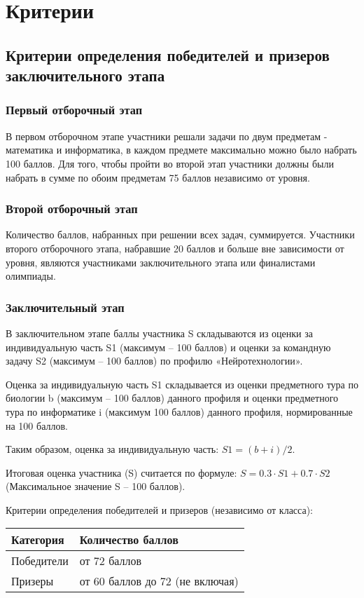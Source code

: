\part{Критерии}

\chapter{Критерии определения победителей и призеров заключительного этапа}
 
\section{Первый отборочный этап}

В первом отборочном этапе участники решали задачи по двум предметам - математика и информатика, в каждом предмете максимально можно было набрать 100 баллов. Для того, чтобы пройти во второй этап участники должны были набрать в сумме по обоим предметам 75 баллов независимо от уровня.

\section{Второй отборочный этап}

Количество баллов, набранных при решении всех задач, суммируется. Участники второго отборочного этапа, набравшие 20 баллов и больше вне зависимости от уровня,  являются участниками заключительного этапа или финалистами олимпиады.

\section{Заключительный этап}

В заключительном этапе баллы участника S складываются из оценки за индивидуальную часть S1 (максимум – 100 баллов) и оценки за командную задачу S2 (максимум – 100 баллов) по профилю «Нейротехнологии».  

Оценка за индивидуальную часть S1 складывается из оценки предметного тура по биологии b (максимум – 100 баллов) данного профиля и оценки предметного тура по информатике i (максимум 100 баллов) данного профиля, нормированные на 100 баллов. 

Таким образом, оценка за индивидуальную часть: $S1 = (b + i)/2$.

Итоговая оценка участника (S) считается по формуле: $S = 0.3 \cdot S1 + 0.7 \cdot S2$ (Максимальное значение S – 100 баллов).
 
Критерии определения победителей и призеров (независимо от класса):
\begin{center}
    \begin{tabular}{|l|p{7cm}|}
        \hline
        Категория&Количество баллов\\
        \hline
        Победители&от 72 баллов \\
        \hline
        Призеры&от 60 баллов до 72 (не включая)\\
        \hline
    \end{tabular}
\end{center}